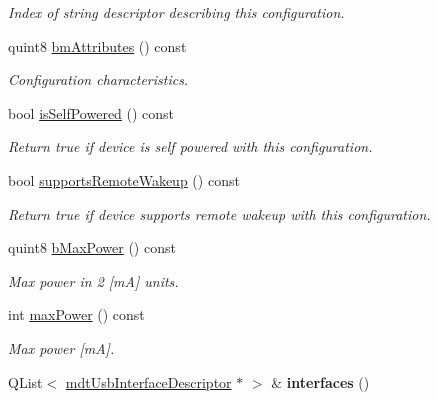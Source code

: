 \begin{DoxyCompactItemize}
\begin{DoxyCompactList}\small\item\em Index of string descriptor describing this configuration. \end{DoxyCompactList}\item 
quint8 \hyperlink{classmdt_usb_config_descriptor_a742b547cbf9e07de7cec89947095bb52}{bmAttributes} () const 
\begin{DoxyCompactList}\small\item\em Configuration characteristics. \end{DoxyCompactList}\item 
bool \hyperlink{classmdt_usb_config_descriptor_a5b8625a40bcca3025419606293b62650}{isSelfPowered} () const 
\begin{DoxyCompactList}\small\item\em Return true if device is self powered with this configuration. \end{DoxyCompactList}\item 
bool \hyperlink{classmdt_usb_config_descriptor_a307f766cfd0cb917490b7d0e4dd7a3ec}{supportsRemoteWakeup} () const 
\begin{DoxyCompactList}\small\item\em Return true if device supports remote wakeup with this configuration. \end{DoxyCompactList}\item 
quint8 \hyperlink{classmdt_usb_config_descriptor_af0bc21aa2f6ebba7069cd9403520a41b}{bMaxPower} () const 
\begin{DoxyCompactList}\small\item\em Max power in 2 \mbox{[}mA\mbox{]} units. \end{DoxyCompactList}\item 
\hypertarget{classmdt_usb_config_descriptor_ad5d10e65295be09359ebf3e775e2e1bd}{
int \hyperlink{classmdt_usb_config_descriptor_ad5d10e65295be09359ebf3e775e2e1bd}{maxPower} () const }
\label{classmdt_usb_config_descriptor_ad5d10e65295be09359ebf3e775e2e1bd}

\begin{DoxyCompactList}\small\item\em Max power \mbox{[}mA\mbox{]}. \end{DoxyCompactList}\item 
\hypertarget{classmdt_usb_config_descriptor_ae318f7d3572fdb3bdab9e4152fe7d80b}{
QList$<$ \hyperlink{classmdt_usb_interface_descriptor}{mdtUsbInterfaceDescriptor} $\ast$ $>$ \& {\bfseries interfaces} ()}
\label{classmdt_usb_config_descriptor_ae318f7d3572fdb3bdab9e4152fe7d80b}

\end{DoxyCompactItemize}


